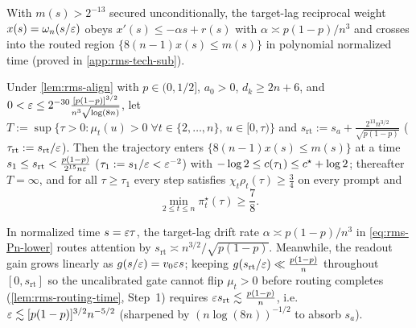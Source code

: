 With $m(s) > 2^{-13}$ secured unconditionally, the target-lag reciprocal weight $x(s) = \omega_n(s/\varepsilon)$ obeys $x'(s) \le -\alpha s + r(s)$ with $\alpha \asymp p(1-p)/n^3$ and crosses into the routed region $\{8(n-1)x(s) \le m(s)\}$ in polynomial normalized time (proved in \cref{app:rms-tech-sub}).

\begin{lemma}
\label{lem:rms-routing-time}
Under \cref{lem:rms-align} with $p \in (0, 1/2]$, $a_0 > 0$, $d_k \ge 2n + 6$, and $0 < \varepsilon \le 2^{-30}\frac{[p(1-p)]^{3/2}}{n^3\sqrt{\log(8n)}}$, let $T := \sup\{\tau > 0 : \mu_t(u) > 0 \;\forall t \in \{2,\ldots,n\},\, u \in [0, \tau)\}$ and $s_{\mathrm{rt}} := s_a + \frac{2^{13}n^{3/2}}{\sqrt{p(1-p)}}$ ($\tau_{\mathrm{rt}} := s_{\mathrm{rt}}/\varepsilon$). Then the trajectory enters $\{8(n-1)x(s) \le m(s)\}$ at a time $s_1 \le s_{\mathrm{rt}} < \frac{p(1-p)}{2^{15}n\varepsilon}$ ($\tau_1 := s_1/\varepsilon < \varepsilon^{-2}$) with $-\log 2 \le c(\tau_1) \le c^\star + \log 2$; thereafter $T = \infty$, and for all $\tau \ge \tau_1$ every step satisfies $\chi_t\rho_t(\tau) \ge \frac{3}{4}$ on every prompt and
\[
  \boxed{\;\min_{2\le t\le n}\pi_t^\star(\tau) \ge \frac{7}{8}.\;}
\]
\end{lemma}

\begin{remark}
\label{rem:rms-eps-role}
In normalized time $s = \varepsilon\tau$, the target-lag drift rate $\alpha \asymp p(1-p)/n^3$ in \cref{eq:rms-Pn-lower} routes attention by $s_{\mathrm{rt}} \asymp n^{3/2}/\sqrt{p(1-p)}$. Meanwhile, the readout gain grows linearly as $g(s/\varepsilon) = v_0\varepsilon s$; keeping $g(s_{\mathrm{rt}}/\varepsilon) \ll \frac{p(1-p)}{n}$ throughout $[0, s_{\mathrm{rt}}]$ so the uncalibrated gate cannot flip $\mu_t > 0$ before routing completes (\cref{lem:rms-routing-time}, Step~1) requires $\varepsilon s_{\mathrm{rt}} \lesssim \frac{p(1-p)}{n}$, i.e.\ $\varepsilon \lesssim [p(1-p)]^{3/2}n^{-5/2}$ (sharpened by $(n\log(8n))^{-1/2}$ to absorb $s_a$).
\end{remark}

